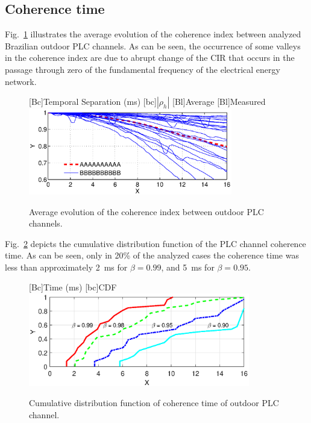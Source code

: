 \documentclass[journal]{IEEEtran}
\newcommand{\tamfig}{3.5in}    %
\begin{document}
\subsection{Coherence time}\label{sec-tempodecoerencia} 
Fig.~\ref{Fig:TCmedio} illustrates the average evolution of the coherence index between analyzed Brazilian outdoor \ac{PLC} channels. As can be seen, the occurrence of some valleys in the coherence index are due to abrupt change of the \ac{CIR} that occurs in the passage through zero of the fundamental frequency of the electrical energy network.  
\begin{figure}[!htp]
\begin{centering}
    [Bc]{Temporal Separation (ms)}    
    [bc]{$|\rho_h|$}
    [Bl]{Average}
    [Bl]{Measured}
    \includegraphics[width=\tamfig]{Figuras/TCmedio.eps}
    \caption{Average evolution of the coherence index between outdoor PLC channels.}
    \label{Fig:TCmedio}
\end{centering}
\end{figure}

Fig.~\ref{Fig:TC_CDF} depicts the cumulative distribution function of the \ac{PLC} channel coherence time. As can be seen,  only in 20\% of the analyzed cases the coherence time was less than approximately 2~ms for $\beta = 0.99$, and 5~ms for $\beta = 0.95$. 
\begin{figure}[!htp]
\begin{centering}
    [Bc]{Time (ms)}    
    [bc]{CDF}
    \includegraphics[width=3.8in]{Figuras/TC_CDF.eps}
    \caption{Cumulative distribution function of coherence time of outdoor PLC channel.}
    \label{Fig:TC_CDF}
\end{centering}
\end{figure}
\end{document}
